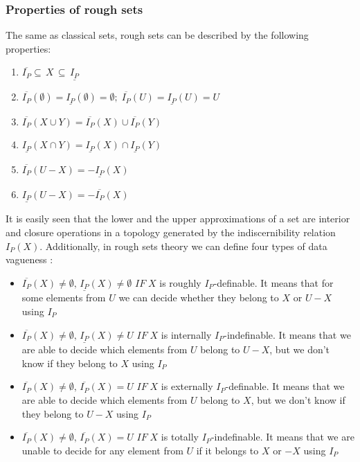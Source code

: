 \subsubsection{Properties of rough sets}
The same as classical sets, rough sets can be described by the
following properties:
\begin{enumerate}
    \item $\overline{I_P} \subseteq \, X \, \subseteq \, \underline{I_P}$
    \item $\overline{I_P}(\emptyset) = \underline{I_P}(\emptyset) = \emptyset;
        \;
        \overline{I_P}(U) = \underline{I_P}(U) = U $
    \item $\overline{I_P}(X \cup Y) = \overline{I_P}(X) \cup \overline{I_P}(Y)$
    \item $\underline{I_P}(X \cap Y) = \underline{I_P}(X) \cap \underline{I_P}(Y)$
    \item $\overline{I_P}(U-X) = -\underline{I_P}(X)$
    \item $\underline{I_P}(U-X) = -\overline{I_P}(X)$
\end{enumerate}
It is easily seen that the lower and the upper 
approximations of a set are interior and 
closure operations in a topology generated by the 
indiscernibility relation $I_P(X)$. Additionally, in rough sets theory 
we can define four types of data vagueness \cite{bib40}:
\begin{itemize}
    \item $\overline{I_P}(X) \neq \emptyset,\, \underline{I_P}(X) \neq
        \emptyset$ $IF\; X$ is roughly $I_P$-definable. It means that for some
        elements from $U$ we can decide whether they belong to $X$ or $U-X$
        using $I_P$
    \item $\overline{I_P}(X) \neq \emptyset,\, \underline{I_P}(X) \neq U$ $IF\;
        X$ is internally $I_P$-indefinable. It means that we are able to decide
        which elements from $U$ belong to $U-X$, but we don't know if they
        belong to $X$ using $I_P$
    \item $\overline{I_P}(X) \neq \emptyset,\, \overline{I_P}(X) = U$ $IF\;
        X$ is externally $I_P$-definable. It means that we are able to decide
        which elements from $U$ belong to $X$, but we don't know if they belong
        to $U-X$ using $I_P$
    \item $\overline{I_P}(X) \neq \emptyset,\, \overline{I_P}(X) = U$ $IF\;
        X$ is totally $I_P$-indefinable. It means that we are unable to decide
        for any element from $U$ if it belongs to $X$ or $-X$ using $I_P$
\end{itemize}
